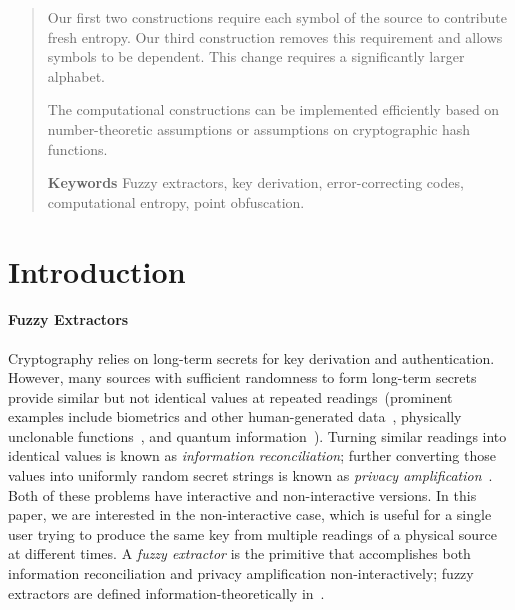 \documentclass[11pt]{article}
\begin{document}
\begin{abstract}
Our first two constructions require each symbol of the source to contribute fresh entropy.  Our third construction removes this requirement and allows symbols to be dependent.  This change requires a significantly larger alphabet.

The computational constructions can be implemented efficiently based on number-theoretic assumptions or assumptions on cryptographic hash functions.

\bigskip

\textbf{Keywords} Fuzzy extractors, key derivation, error-correcting codes, computational entropy, point obfuscation.
\end{abstract}


\section{Introduction}\label{sec:introduction}

\paragraph{Fuzzy Extractors}
Cryptography relies on long-term secrets for key derivation and authentication. However, many sources with sufficient randomness to form long-term secrets provide similar but not identical values at repeated readings~(prominent examples include biometrics and other human-generated data~\cite{daugman2004,zviran1993comparison,brostoff2000passfaces,ellison2000protecting,mayrhofer2009shake,monrose2002password},
physically unclonable functions~\cite{pappu2002physical,tuyls2006puf,gassend2002silicon,suh2007physical},
and quantum information~\cite{bennett1988privacy}). Turning similar readings into identical values is known as \emph{information reconciliation}; further converting those values into uniformly random secret strings is known as \emph{privacy amplification}~\cite{bennett1988privacy}.
Both of these problems have interactive and non-interactive versions.  In this paper, we are interested in the non-interactive case, which is useful for a single user trying to produce the same key from multiple readings of a physical source at different times.
 A \emph{fuzzy extractor} is the primitive that accomplishes both information reconciliation and privacy amplification non-interactively; fuzzy extractors are defined information-theoretically in~\cite{DBLP:journals/siamcomp/DodisORS08}.
\end{document}
